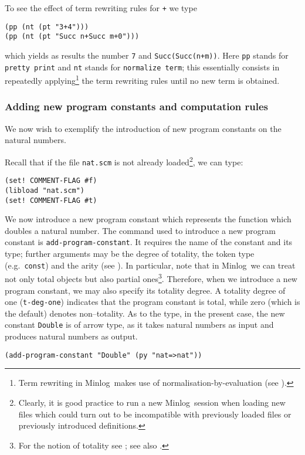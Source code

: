 \documentclass[12pt]{amsart}
\newcommand{\mi}{Minlog}
\begin{document}
To see the effect of term rewriting rules for \texttt{+} we type
\begin{verbatim}
(pp (nt (pt "3+4")))
(pp (nt (pt "Succ n+Succ m+0")))
\end{verbatim}
which yields as results the number \texttt{7} and
\texttt{Succ(Succ(n+m))}.  Here \texttt{pp} stands for \texttt{pretty
  print} and \texttt{nt} stands for \texttt{normalize term}; this
essentially consists in repeatedly applying\footnote{Term rewriting in
  \mi\ makes use of normalisation-by-evaluation (see
  \cite{minlogman}).} the term rewriting rules until no new term is
obtained.


\subsubsection{Adding new program constants and computation rules}
We now wish to exemplify the introduction of new program constants on
the natural numbers.

Recall that if the file \texttt{nat.scm} is not already
loaded\footnote{Clearly, it is good practice to run a new \mi\ session
  when loading new files which could turn out to be incompatible with
  previously loaded files or previously introduced definitions.}, we
can type:
\begin{verbatim}
(set! COMMENT-FLAG #f)
(libload "nat.scm")
(set! COMMENT-FLAG #t)
\end{verbatim}

We now introduce a new program constant which represents the function
which doubles a natural number.  The command used to introduce a new
program constant is \texttt{add-program-constant}. It requires the
name of the constant and its type; further arguments may be the degree
of totality, the token type (e.g.\ \texttt{const}) and the arity (see
\cite{minlogman}).  In particular, note that in \mi\ we can treat not
only total objects but also partial ones\footnote{For the notion of
  totality see \cite[Chapter 8.3]{Stoltenberg94}; see also
  \cite{SchwichtenbergWainer12}.}.  Therefore, when we introduce a new
program constant, we may also specify its totality degree. A totality
degree of one (\texttt{t-deg-one}) indicates that the program constant
is total, while zero (which is the default) denotes non--totality.  As
to the type, in the present case, the new constant \texttt{Double} is
of arrow type, as it takes natural numbers as input and produces
natural numbers as output.

\begin{verbatim}
(add-program-constant "Double" (py "nat=>nat"))
\end{verbatim}
\end{document}
